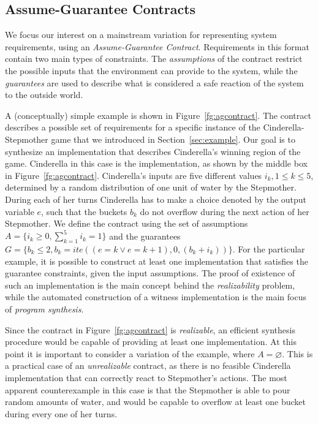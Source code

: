 \subsection{Assume-Guarantee Contracts}
\label{sec:pre}

We focus our interest on a mainstream variation for representing system requirements, using an \textit{Assume-Guarantee
Contract}. Requirements in this format contain two main types of constraints.
The \emph{assumptions} of the contract restrict the possible inputs that the
environment can provide to the system, while the \emph{guarantees} are used to
describe what is considered a safe reaction of the system to the outside world.

A (conceptually) simple example is shown in Figure~\ref{fg:agcontract}. The contract describes a possible set of requirements for a specific instance of the Cinderella-Stepmother game that we introduced in Section~\ref{sec:example}. Our goal is to synthesize an implementation that describes Cinderella's winning region of the game. Cinderella in this case is the implementation, as shown by the middle box in Figure~\ref{fg:agcontract}. Cinderella's inputs are five different values $i_k, 1 \leq k \leq 5$, determined by a random distribution of one unit of water by the Stepmother. During each of her turns Cinderella has to make a choice denoted by the output variable $e$, such that the buckets $b_k$ do not overflow during the next action of her Stepmother. We define the contract using the set of assumptions $A = \{i_k \geq 0, \sum_{k=1}^{5} i_k = 1\}$ and the guarantees $G = \{b_k \leq 2, b_k = ite((e=k \lor e=k+1), 0, (b_k+i_k))\}$. For the particular example, it is possible to construct at least one implementation that satisfies the guarantee constraints, given the input assumptions. The proof of existence of such an implementation  is the main concept behind the \emph{realizability} problem, while the automated construction of a witness implementation is the main focus of \emph{program synthesis}.


Since the contract in Figure~\ref{fg:agcontract} is \emph{realizable}, an efficient synthesis procedure would be capable of providing at least one
implementation. At this point it is important to consider a variation of the example, where $A = \varnothing$. This is a practical case of an
\emph{unrealizable} contract, as there is no feasible Cinderella implementation that can correctly react to Stepmother's actions. The most apparent counterexample in this case is that the Stepmother is able to pour random amounts of water, and would be capable to overflow at least one bucket during every one of her turns.

